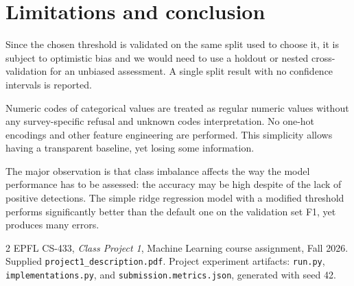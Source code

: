 \documentclass[10pt,conference,compsocconf]{IEEEtran}
\begin{document}
\section{Limitations and conclusion}
Since the chosen threshold is validated on the same split used to choose it, 
it is subject to optimistic bias and we would need to use a holdout or nested cross-validation
for an unbiased assessment. A single split result with no confidence intervals is reported.

Numeric codes of categorical values are treated as regular numeric values without any survey-specific
refusal and unknown codes interpretation. No one-hot encodings and other feature engineering are performed.
This simplicity allows having a transparent baseline, yet losing some information.

The major observation is that class imbalance affects the way the model performance has to be assessed: the accuracy may be high despite of the lack of positive detections.
The simple ridge regression model with a modified threshold performs significantly better than the default one on the validation set F1, yet produces many errors.

\begin{thebibliography}{2}
EPFL CS-433, \emph{Class Project 1}, Machine Learning course assignment,
Fall 2026. Supplied \texttt{project1\_description.pdf}.
Project experiment artifacts: \texttt{run.py},
\texttt{implementations.py}, and \texttt{submission.metrics.json},
generated with seed 42.
\end{thebibliography}
\end{document}
